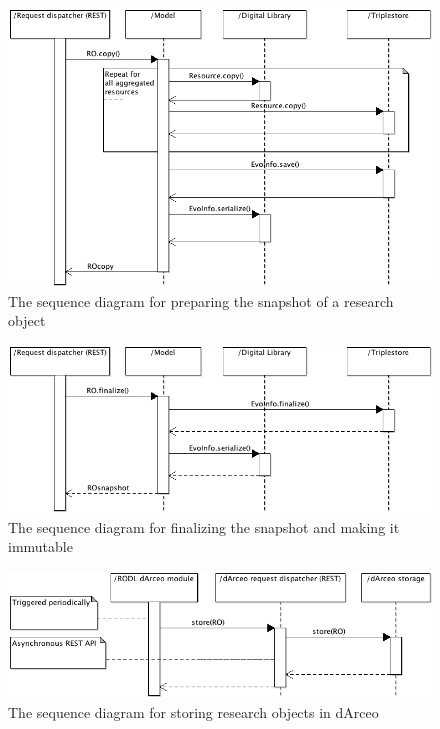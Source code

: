 \begin{figure}[!hb]
\centering
\includegraphics[width=\textwidth]{Figures/RODL/SnapshotPerform.png}
\caption{The sequence diagram for preparing the snapshot of a research object}
\label{SnapshotPerform}
\end{figure}

\begin{figure}[!hb]
\centering
\includegraphics[width=\textwidth]{Figures/RODL/SnapshotFinalize.png}
\caption{The sequence diagram for finalizing the snapshot and making it immutable}
\label{SnapshotFinalize}
\end{figure}

\begin{figure}[!hb]
\centering
\includegraphics[width=\textwidth]{Figures/RODL/dArceoStore.png}
\caption{The sequence diagram for storing research objects in dArceo}
\label{dArceoStore}
\end{figure}


